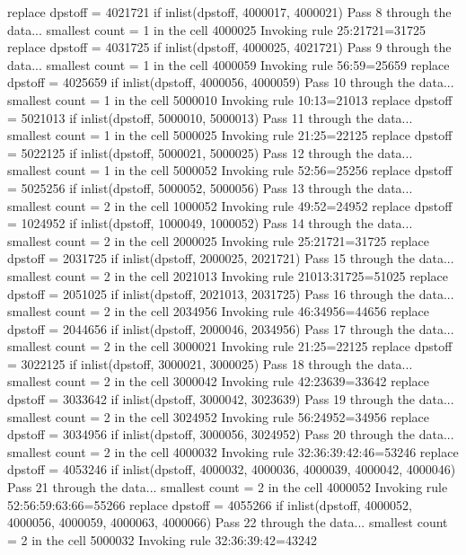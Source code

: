   replace dpstoff = 4021721 if inlist(dpstoff, 4000017, 4000021)
Pass 8 through the data...
  smallest count = 1 in the cell      4000025
  Invoking rule 25:21721=31725
  replace dpstoff = 4031725 if inlist(dpstoff, 4000025, 4021721)
Pass 9 through the data...
  smallest count = 1 in the cell      4000059
  Invoking rule 56:59=25659
  replace dpstoff = 4025659 if inlist(dpstoff, 4000056, 4000059)
Pass 10 through the data...
  smallest count = 1 in the cell      5000010
  Invoking rule 10:13=21013
  replace dpstoff = 5021013 if inlist(dpstoff, 5000010, 5000013)
Pass 11 through the data...
  smallest count = 1 in the cell      5000025
  Invoking rule 21:25=22125
  replace dpstoff = 5022125 if inlist(dpstoff, 5000021, 5000025)
Pass 12 through the data...
  smallest count = 1 in the cell      5000052
  Invoking rule 52:56=25256
  replace dpstoff = 5025256 if inlist(dpstoff, 5000052, 5000056)
Pass 13 through the data...
  smallest count = 2 in the cell      1000052
  Invoking rule 49:52=24952
  replace dpstoff = 1024952 if inlist(dpstoff, 1000049, 1000052)
Pass 14 through the data...
  smallest count = 2 in the cell      2000025
  Invoking rule 25:21721=31725
  replace dpstoff = 2031725 if inlist(dpstoff, 2000025, 2021721)
Pass 15 through the data...
  smallest count = 2 in the cell      2021013
  Invoking rule 21013:31725=51025
  replace dpstoff = 2051025 if inlist(dpstoff, 2021013, 2031725)
Pass 16 through the data...
  smallest count = 2 in the cell      2034956
  Invoking rule 46:34956=44656
  replace dpstoff = 2044656 if inlist(dpstoff, 2000046, 2034956)
Pass 17 through the data...
  smallest count = 2 in the cell      3000021
  Invoking rule 21:25=22125
  replace dpstoff = 3022125 if inlist(dpstoff, 3000021, 3000025)
Pass 18 through the data...
  smallest count = 2 in the cell      3000042
  Invoking rule 42:23639=33642
  replace dpstoff = 3033642 if inlist(dpstoff, 3000042, 3023639)
Pass 19 through the data...
  smallest count = 2 in the cell      3024952
  Invoking rule 56:24952=34956
  replace dpstoff = 3034956 if inlist(dpstoff, 3000056, 3024952)
Pass 20 through the data...
  smallest count = 2 in the cell      4000032
  Invoking rule 32:36:39:42:46=53246
  replace dpstoff = 4053246 if inlist(dpstoff, 4000032, 4000036, 4000039, 4000042, 4000046)
Pass 21 through the data...
  smallest count = 2 in the cell      4000052
  Invoking rule 52:56:59:63:66=55266
  replace dpstoff = 4055266 if inlist(dpstoff, 4000052, 4000056, 4000059, 4000063, 4000066)
Pass 22 through the data...
  smallest count = 2 in the cell      5000032
  Invoking rule 32:36:39:42=43242
